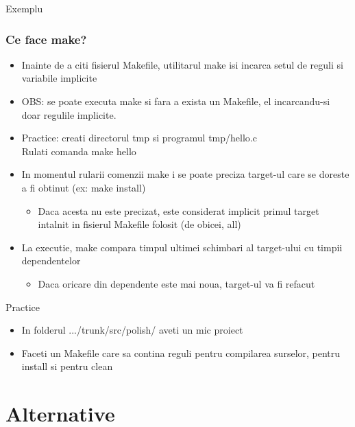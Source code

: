 \documentclass{beamer}
\begin{document}
    \begin{frame}{Exemplu}
    
    \end{frame}

    \begin{frame}[allowframebreaks]
    \frametitle{Ce face make?}
    \begin{itemize}
    \setlength{\itemsep}{0.6cm}
    \item Inainte de a citi fisierul Makefile, utilitarul make isi incarca setul de reguli si variabile implicite
    \item OBS: se poate executa make si fara a exista un Makefile, el incarcandu-si doar regulile implicite.
    \item Practice: creati directorul {\ttfamily tmp} si programul {\ttfamily tmp/hello.c}\\Rulati comanda {\ttfamily make hello}
    \framebreak
    \item In momentul rularii comenzii make i se poate preciza target-ul care se doreste a fi obtinut (ex: make install)\begin{itemize}\item \vspace{0.6cm}Daca acesta nu este precizat, este considerat implicit primul target intalnit in fisierul Makefile folosit (de obicei, {\ttfamily all}) \end{itemize}
    \item La executie, make compara timpul ultimei schimbari al target-ului cu timpii dependentelor \begin{itemize}\item \vspace{0.6cm}Daca oricare din dependente este mai noua, target-ul va fi refacut \end{itemize}
    \end{itemize}
    \end{frame}

    \begin{frame}{Practice}
    \begin{itemize}
    \setlength{\itemsep}{1cm}
    \item In folderul .../trunk/src/polish/ aveti un mic proiect
    \item Faceti un Makefile care sa contina reguli pentru compilarea surselor, pentru install si pentru clean
    \end{itemize}
    \end{frame}

\section{Alternative}
    \frame{\tableofcontents[currentsection]}
    
\end{document}
